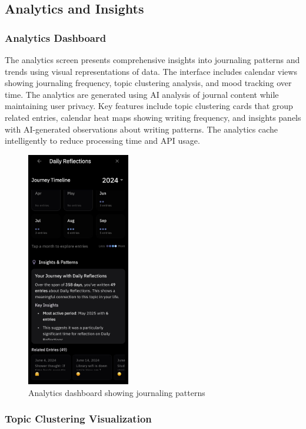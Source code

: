 \subsection{Analytics and Insights}

\subsubsection{Analytics Dashboard}

The analytics screen presents comprehensive insights into journaling patterns and trends using visual representations of data. The interface includes calendar views showing journaling frequency, topic clustering analysis, and mood tracking over time. The analytics are generated using AI analysis of journal content while maintaining user privacy. Key features include topic clustering cards that group related entries, calendar heat maps showing writing frequency, and insights panels with AI-generated observations about writing patterns. The analytics cache intelligently to reduce processing time and API usage.

\begin{figure}[H]
\centering
\includegraphics[width=0.4\textwidth]{files/imgs/prototype/analytics_screen.jpeg}
\caption{Analytics dashboard showing journaling patterns}
\label{fig:analytics-screen}
\end{figure}

\subsubsection{Topic Clustering Visualization}

